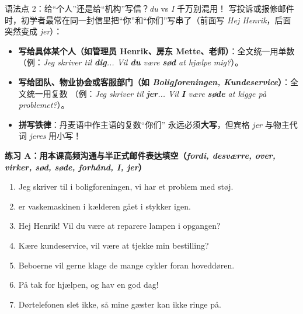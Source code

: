 \begin{grammatikbox}{语法点 2：给“个人”还是给“机构”写信？\textit{du} vs \textit{I} 千万别混用！}
写投诉或报修邮件时，初学者最常在同一封信里把“你”和“你们”写串了（前面写 \textit{Hej Henrik}，后面突然变成 \textit{jer}）：
\begin{itemize}
  \item \textbf{写给具体某个人（如管理员 Henrik、房东 Mette、老师）}：全文统一用单数 （例：\textit{Jeg skriver til \textbf{dig}... Vil \textbf{du} være \textbf{sød} at hjælpe mig?}）。
  \item \textbf{写给团队、物业协会或客服部门（如 \textit{Boligforeningen, Kundeservice}）}：全文统一用复数 （例：\textit{Jeg skriver til \textbf{jer}... Vil \textbf{I} være \textbf{søde} at kigge på problemet?}）。
  \item \textbf{拼写铁律}：丹麦语中作主语的复数“你们” 永远必须\textbf{大写}，但宾格 \textit{jer} 与物主代词 \textit{jeres} 用小写！
\end{itemize}
\end{grammatikbox}


\textbf{练习 A：用本课高频沟通与半正式邮件表达填空（\textit{fordi, desværre, over, virker, sød, søde, forhånd, I, jer}）}
\begin{enumerate}
  \item Jeg skriver til \underline{\hspace{1.6cm}} i boligforeningen, \underline{\hspace{1.6cm}} vi har et problem med støj.
  \item \underline{\hspace{2.0cm}} er vaskemaskinen i kælderen gået i stykker igen.
  \item Hej Henrik! Vil du være \underline{\hspace{1.4cm}} at reparere lampen i opgangen?
  \item Kære kundeservice, vil \underline{\hspace{1.0cm}} være \underline{\hspace{1.4cm}} at tjekke min bestilling?
  \item Beboerne vil gerne klage \underline{\hspace{1.6cm}} de mange cykler foran hoveddøren.
  \item På \underline{\hspace{2.0cm}} tak for hjælpen, og hav en god dag!
  \item Dørtelefonen \underline{\hspace{1.8cm}} slet ikke, så mine gæster kan ikke ringe på.
\end{enumerate}

